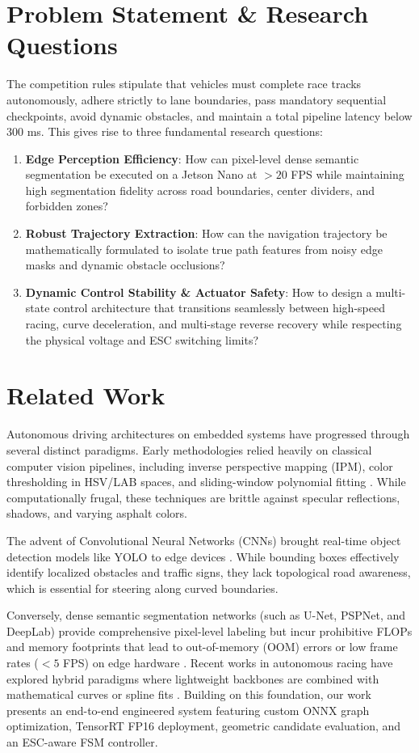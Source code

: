 \documentclass[conference]{IEEEtran}
\begin{document}
\section{Problem Statement \& Research Questions}
The competition rules stipulate that vehicles must complete race tracks autonomously, adhere strictly to lane boundaries, pass mandatory sequential checkpoints, avoid dynamic obstacles, and maintain a total pipeline latency below 300 ms. This gives rise to three fundamental research questions:
\begin{enumerate}
    \item \textbf{Edge Perception Efficiency}: How can pixel-level dense semantic segmentation be executed on a Jetson Nano at $>20$ FPS while maintaining high segmentation fidelity across road boundaries, center dividers, and forbidden zones?
    \item \textbf{Robust Trajectory Extraction}: How can the navigation trajectory be mathematically formulated to isolate true path features from noisy edge masks and dynamic obstacle occlusions?
    \item \textbf{Dynamic Control Stability \& Actuator Safety}: How to design a multi-state control architecture that transitions seamlessly between high-speed racing, curve deceleration, and multi-stage reverse recovery while respecting the physical voltage and ESC switching limits?
\end{enumerate}

\section{Related Work}
Autonomous driving architectures on embedded systems have progressed through several distinct paradigms. Early methodologies relied heavily on classical computer vision pipelines, including inverse perspective mapping (IPM), color thresholding in HSV/LAB spaces, and sliding-window polynomial fitting \cite{ref4}. While computationally frugal, these techniques are brittle against specular reflections, shadows, and varying asphalt colors.

The advent of Convolutional Neural Networks (CNNs) brought real-time object detection models like YOLO to edge devices \cite{ref5, ref6}. While bounding boxes effectively identify localized obstacles and traffic signs, they lack topological road awareness, which is essential for steering along curved boundaries.

Conversely, dense semantic segmentation networks (such as U-Net, PSPNet, and DeepLab) provide comprehensive pixel-level labeling but incur prohibitive FLOPs and memory footprints that lead to out-of-memory (OOM) errors or low frame rates ($<5$ FPS) on edge hardware \cite{ref7, ref8}. Recent works in autonomous racing have explored hybrid paradigms where lightweight backbones are combined with mathematical curves or spline fits \cite{ref9, ref10}. Building on this foundation, our work presents an end-to-end engineered system featuring custom ONNX graph optimization, TensorRT FP16 deployment, geometric candidate evaluation, and an ESC-aware FSM controller.
\end{document}
